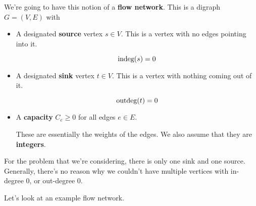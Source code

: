 \documentclass[12pt]{article}
\begin{document}
  {
    We're going to have this notion of a {\bf flow network}. This is a digraph
    $G = (V, E)$ with

    \begin{itemize}
      \item A designated {\bf source} vertex $s \in V$. This is a vertex with no
        edges pointing into it.

        \[
          \text{indeg}(s) = 0
        \]

      \item A designated {\bf sink} vertex $t \in V$. This is a vertex with
        nothing coming out of it.

        \[
          \text{outdeg}(t) = 0
        \]

      \item A {\bf capacity} $C_e \ge 0$ for all edges $e \in E$.

        These are essentially the weights of the edges. We also assume that they
        are {\bf integers}.

    \end{itemize}
  }

  For the problem that we're considering, there is only one sink and one
  source. Generally, there's no reason why we couldn't have multiple vertices
  with in-degree $0$, or out-degree $0$.

  Let's look at an example flow network.

\end{document}
